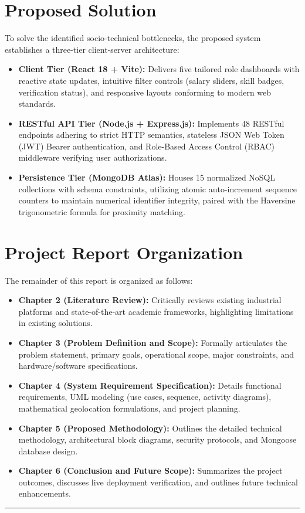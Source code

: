 \section{Proposed Solution}
To solve the identified socio-technical bottlenecks, the proposed system establishes a three-tier client-server architecture:
\begin{itemize}
    \item \textbf{Client Tier (React 18 + Vite):} Delivers five tailored role dashboards with reactive state updates, intuitive filter controls (salary sliders, skill badges, verification status), and responsive layouts conforming to modern web standards.
    \item \textbf{RESTful API Tier (Node.js + Express.js):} Implements 48 RESTful endpoints adhering to strict HTTP semantics, stateless JSON Web Token (JWT) Bearer authentication, and Role-Based Access Control (RBAC) middleware verifying user authorizations.
    \item \textbf{Persistence Tier (MongoDB Atlas):} Houses 15 normalized NoSQL collections with schema constraints, utilizing atomic auto-increment sequence counters to maintain numerical identifier integrity, paired with the Haversine trigonometric formula for proximity matching.
\end{itemize}

\section{Project Report Organization}
The remainder of this report is organized as follows:
\begin{itemize}
    \item \textbf{Chapter 2 (Literature Review):} Critically reviews existing industrial platforms and state-of-the-art academic frameworks, highlighting limitations in existing solutions.
    \item \textbf{Chapter 3 (Problem Definition and Scope):} Formally articulates the problem statement, primary goals, operational scope, major constraints, and hardware/software specifications.
    \item \textbf{Chapter 4 (System Requirement Specification):} Details functional requirements, UML modeling (use cases, sequence, activity diagrams), mathematical geolocation formulations, and project planning.
    \item \textbf{Chapter 5 (Proposed Methodology):} Outlines the detailed technical methodology, architectural block diagrams, security protocols, and Mongoose database design.
    \item \textbf{Chapter 6 (Conclusion and Future Scope):} Summarizes the project outcomes, discusses live deployment verification, and outlines future technical enhancements.
\end{itemize}

\vspace{10mm}
\hrule

